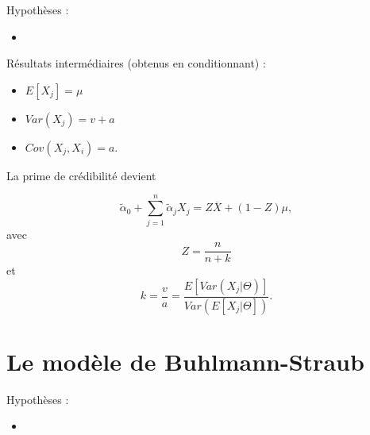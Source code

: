 Hypothèses : 

\begin{itemize}
	\item 
\end{itemize}

Résultats intermédiaires (obtenus en conditionnant) :

\begin{itemize}
	\item $\displaystyle E[X_j] = \mu$
	\item $\displaystyle Var(X_j) = v + a$
	\item $\displaystyle Cov(X_j, X_i) = a$.
\end{itemize}

La prime de crédibilité devient

$$\tilde{\alpha}_0 + \sum_{j = 1}^{n}\tilde{\alpha}_jX_j = Z\overline{X} + (1-Z)\mu,$$
avec
$$Z = \frac{n}{n + k}$$
et
$$k = \frac{v}{a} = \frac{E[Var(X_j \vert \Theta)]}{Var(E[X_j \vert \Theta])}.$$

\section{Le modèle de Buhlmann-Straub}

Hypothèses : 

\begin{itemize}
	\item 
\end{itemize}









